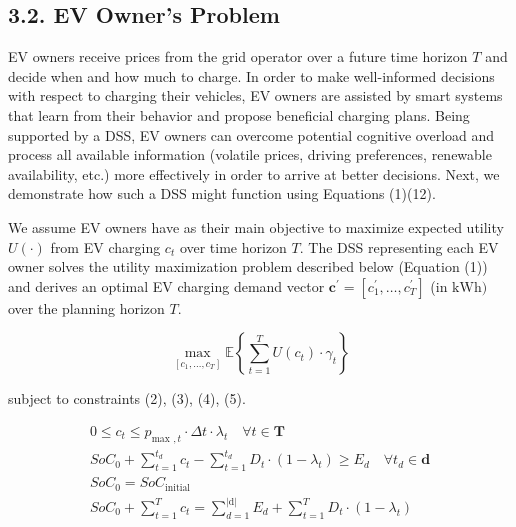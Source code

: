\documentclass[10pt]{article}
\begin{document}
\subsection*{3.2. EV Owner's Problem}
EV owners receive prices from the grid operator over a future time horizon $T$ and decide when and how much to charge. In order to make well-informed decisions with respect to charging their vehicles, EV owners are assisted by smart systems that learn from their behavior and propose beneficial charging plans. Being supported by a DSS, EV owners can overcome potential cognitive overload and process all available information (volatile prices, driving preferences, renewable availability, etc.) more effectively in order to arrive at better decisions. Next, we demonstrate how such a DSS might function using Equations (1)(12).

We assume EV owners have as their main objective to maximize expected utility $U(\cdot)$ from EV charging $c_{t}$ over time horizon $T$. The DSS representing each EV owner solves the utility maximization problem described below (Equation (1)) and derives an optimal EV charging demand vector $\mathbf{c}^{\prime}=\left[c_{1}^{\prime}, \ldots, c_{T}^{\prime}\right]$ (in $\mathrm{kWh})$ over the planning horizon $T$.


\begin{equation*}
\max _{\left[c_{1}, \ldots, c_{T}\right]} \mathbb{E}\left\{\sum_{t=1}^{T} U\left(c_{t}\right) \cdot \gamma_{t}\right\} \tag{1}
\end{equation*}


subject to constraints (2), (3), (4), (5).


\begin{gather*}
0 \leq c_{t} \leq p_{\text {max }, t} \cdot \Delta t \cdot \lambda_{t} \quad \forall t \in \mathbf{T}  \tag{2}\\
S o C_{0}+\sum_{t=1}^{t_{d}} c_{t}-\sum_{t=1}^{t_{d}} D_{t} \cdot\left(1-\lambda_{t}\right) \geq E_{d} \quad \forall t_{d} \in \mathbf{d}  \tag{3}\\
S o C_{0}=S o C_{\text {initial }}  \tag{4}\\
S o C_{0}+\sum_{t=1}^{T} c_{t}=\sum_{d=1}^{|\mathrm{d}|} E_{d}+\sum_{t=1}^{T} D_{t} \cdot\left(1-\lambda_{t}\right) \tag{5}
\end{gather*}
\end{document}
